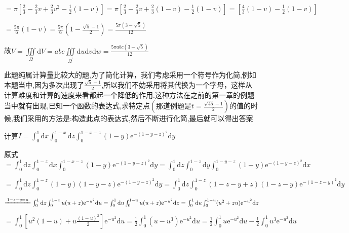 \begin{xiti}
\begin{solution}
		$=\pi \left[\frac{2}{3} - \frac{2}{3} v + \frac{2}{3} v^{2} - \frac{1}{2} (1-v) \right] = \pi \left[\frac{2}{3} - \frac{2}{3} v + \frac{2}{3} (1-v)  - \frac{1}{2} (1-v) \right] = \left[\frac{4}{3} (1-v)  - \frac{1}{2} (1-v) \right]$
		
		$= \frac{5\pi}{6} (1-v) = \frac{5\pi}{6} \left( 1-\frac{\sqrt{5}-1}{2} \right) = \frac{5\pi (3-\sqrt{5})}{12}$
		
		故$V=\iiint\limits_{\Omega} \mathrm{d} V = abc \iiint\limits_{{\Omega}^{\prime}} \mathrm{d} u \mathrm{d} v \mathrm{d} w = \frac{5\pi abc (3-\sqrt 5)}{12}$
		
		\begin{note}
			此题纯属计算量比较大的题,为了简化计算，我们考虑采用一个符号作为化简,例如本题当中,因为多次出现了$\frac{\sqrt{5}-1}{2}$,所以我们不妨采用将其代换为一个字母，这样从计算难度和计算的速度来看都起一个降低的作用.这种方法在之前的第一章的例题当中就有出现,已知一个函数的表达式,求特定点$\left( \text{那道例题是} t= \frac{ \sqrt{45}-1 } {2}\right)$的值的时候,我们采用的方法是:构造此点的表达式,然后不断进行化简,最后就可以得出答案
		\end{note}
	\end{solution}
	
	\item 计算$
	I=\int_{0}^{1} \mathrm{d} x \int_{0}^{1-x} \mathrm{d} z \int_{0}^{1-x-z}(1-y) \mathrm{e}^{-(1-y-z)^{2}} \mathrm{d} y$
	\begin{solution}
		原式$=\int_{0}^{1} \mathrm{d} z \int_{0}^{1-z} \mathrm{d} x \int_{0}^{1-x-z}(1-y) \mathrm{e}^{-(1-y-z)^{2}} \mathrm{d} y = \int_{0}^{1} \mathrm{d} z \int_{0}^{1-z} \mathrm{d} y \int_{0}^{1-y-z}(1-y) \mathrm{e}^{-(1-y-z)^{2}} \mathrm{d} x$
		
		$=\int_{0}^{1} \mathrm{d} z \int_{0}^{1-z} (1-y)(1-y-z) \mathrm{e}^{-(1-y-z)^{2}} \mathrm{d} y  =\int_{0}^{1} \mathrm{d} z \int_{0}^{1-z} (1-z-y+z)(1-z-y) \mathrm{e}^{-(1-z-y)^{2}} \mathrm{d} y$
		
		$\xlongequal{1-z-y=u} \int_{0}^{1} \mathrm{d} z \int_{0}^{1-z} u(u+z) \mathrm{e}^{-u^{2}} \mathrm{d} u = \int_{0}^{1} \mathrm{d} u \int_{0}^{1-u} u(u+z) \mathrm{e}^{-u^{2}} \mathrm{d} z = \int_{0}^{1} \mathrm{d} u \int_{0}^{1-u} (u^{2}+zu) \mathrm{e}^{-u^{2}} \mathrm{d} z$
		
		$= \int_{0}^{1} \left[u^{2}(1-u)+u \frac{(1-u)^{2}}{2} \right] \mathrm{e}^{-u^{2}} \mathrm{d} u = \frac{1}{2} \int_{0}^{1} (u-u^{3}) \mathrm{e}^{-u^{2}} \mathrm{d} u = \frac{1}{2} \int_{0}^{1} u \mathrm{e}^{-u^{2}} \mathrm{d} u-\frac{1}{2} \int_{0}^{1} u^{3} \mathrm{e}^{-u^{2}} \mathrm{d} u $
		

\end{solution}
\end{xiti}
